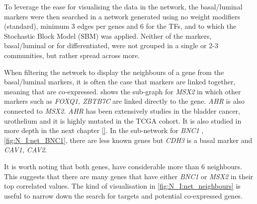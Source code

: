 To leverage the ease for visualising the data in the network, the basal/luminal markers were then searched in a network generated using no weight modifiers (standard), minimum 3 edges per genes and 6 for the TFs, and to which the Stochastic Block Model (SBM) was applied. Neither of the markers, basal/luminal or for differentiated, were not grouped in a single or 2-3 communities, but rather spread across more.

When filtering the network to display the neighbours of a  gene from the basal/luminal markers, it is often the case that markers are linked together, meaning that are co-expressed.  shows the sub-graph for \textit{MSX2} in which other markers such as \textit{FOXQ1, ZBTB7C} are linked directly to the gene. \textit{AHR} is also connected to \textit{MSX2}. \textit{AHR} has been extensively studies in the bladder cancer, urothelium and it is highly mutated in the TCGA cohort. It is also studied in more depth in the next chapter \ref{}. In the sub-network for \textit{BNC1} , \cref{fig:N_I:net_BNC1}, there are less known genes but \textit{CDH3} is a basal marker \citet{Dadhania2016-cb} and \textit{CAV1, CAV2}. 

It is worth noting that both genes, have considerable more than 6 neighbours. This suggests that there are many genes that have either \textit{BNC1} or \textit{MSX2} in their top correlated values. The kind of visualisation in \cref{fig:N_I:net_neighbours} is useful to narrow down the search for targets and potential co-expressed genes.

